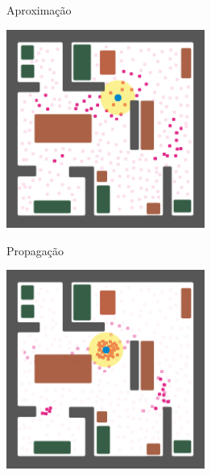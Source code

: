 \documentclass{beamer}
\begin{document}
\begin{frame}{Aproximação}

 
  \begin{center}
  \includegraphics[height=6.5cm,keepaspectratio]{4-particle-filter-after-weighting.png}
  \end{center}

\end{frame}



\begin{frame}{Propagação}
 

  \begin{center}
  \includegraphics[height=6.5cm,keepaspectratio]{5-particle-filter-after-move.png}
  \end{center}

\end{frame}



\end{document}
